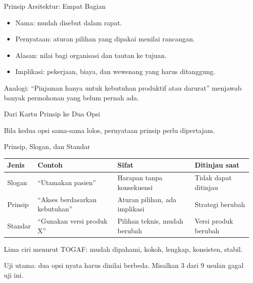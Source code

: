 \documentclass[aspectratio=169, table, 12pt]{beamer}
\begin{document}
\begin{frame}{{\Large Prinsip Arsitektur: Empat Bagian}}
  \vspace{10pt}
  \begin{itemize}
    \item Nama: mudah disebut dalam rapat.
    \item Pernyataan: aturan pilihan yang dipakai menilai rancangan.
    \item Alasan: nilai bagi organisasi dan tautan ke tujuan.
    \item Implikasi: pekerjaan, biaya, dan wewenang yang harus ditanggung.
  \end{itemize}
  \vspace{6pt}
  {\small Analogi: ``Pinjaman hanya untuk kebutuhan produktif atau darurat'' menjawab banyak
  permohonan yang belum pernah ada.}
\end{frame}

\begin{frame}{{\Large Dari Kartu Prinsip ke Dua Opsi}}
  \centering

  \vspace{6pt}
  {\small Bila kedua opsi sama-sama lolos, pernyataan prinsip perlu dipertajam.}
\end{frame}

\begin{frame}{{\Large Prinsip, Slogan, dan Standar}}
  \footnotesize
  \begin{tabularx}{\textwidth}{>{\raggedright\arraybackslash}p{1.8cm}
      >{\raggedright\arraybackslash}X >{\raggedright\arraybackslash}X
      >{\raggedright\arraybackslash}X}
    \hline
    \textbf{Jenis} & \textbf{Contoh} & \textbf{Sifat} & \textbf{Ditinjau saat} \\
    \hline
    Slogan & ``Utamakan pasien'' & Harapan tanpa konsekuensi & Tidak dapat ditinjau \\
    \hline
    Prinsip & ``Akses berdasarkan kebutuhan'' & Aturan pilihan, ada implikasi & Strategi berubah \\
    \hline
    Standar & ``Gunakan versi produk X'' & Pilihan teknis, mudah berubah & Versi produk berubah \\
    \hline
  \end{tabularx}

  \vspace{8pt}
  \small Lima ciri menurut TOGAF: mudah dipahami, kokoh, lengkap, konsisten, stabil.

  \vspace{4pt}
  Uji utama: dua opsi nyata harus dinilai berbeda. Misalkan 3 dari 9 usulan gagal uji ini.
\end{frame}
\end{document}
